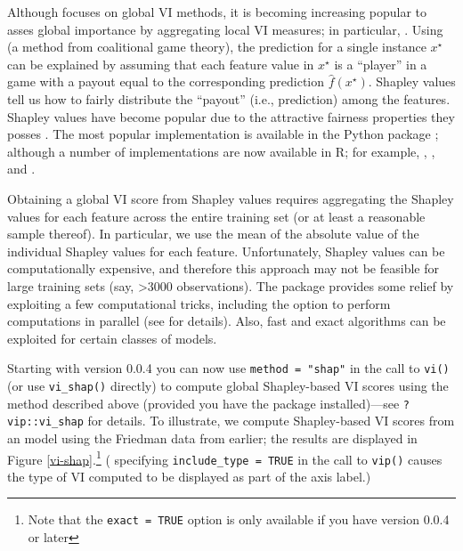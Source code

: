Although  focuses on global VI methods, it is becoming
increasing popular to asses global importance by aggregating local VI
measures; in particular, 
\citep{strumbelj-2014-explaining}. Using  (a method
from coalitional game theory), the prediction for a single instance
\(x^\star\) can be explained by assuming that each feature value in
\(x^\star\) is a ``player'' in a game with a payout equal to the
corresponding prediction \(\widehat{f}\left(x^\star\right)\). Shapley
values tell us how to fairly distribute the ``payout'' (i.e.,
prediction) among the features. Shapley values have become popular due
to the attractive fairness properties they posses
\citep{lundberg_unified_2017}. The most popular implementation is
available in the Python  package
\citep{lundberg_unified_2017}; although a number of implementations are
now available in R; for example, , 
\citep{R-iBreakDown}, and  \citep{R-fastshap}.

Obtaining a global VI score from Shapley values requires aggregating the
Shapley values for each feature across the entire training set (or at
least a reasonable sample thereof). In particular, we use the mean of
the absolute value of the individual Shapley values for each feature.
Unfortunately, Shapley values can be computationally expensive, and
therefore this approach may not be feasible for large training sets
(say, \textgreater{}3000 observations). The  package
provides some relief by exploiting a few computational tricks, including
the option to perform computations in parallel (see
 for details). Also, fast and exact algorithms
\citep{lundberg-explainable-2019} can be exploited for certain classes
of models.

Starting with  version 0.0.4 you can now use
\texttt{method\ =\ "shap"} in the call to \texttt{vi()} (or use
\texttt{vi\_shap()} directly) to compute global Shapley-based VI scores
using the method described above (provided you have the 
package installed)---see \texttt{?vip::vi\_shap} for details. To
illustrate, we compute Shapley-based VI scores from an 
model \citep{R-xgboost} using the Friedman data from earlier; the
results are displayed in Figure \ref{vi-shap}.\footnote{Note that the
  \texttt{exact\ =\ TRUE} option is only available if you have
   version 0.0.4 or later} ( specifying
\texttt{include\_type\ =\ TRUE} in the call to \texttt{vip()} causes the
type of VI computed to be displayed as part of the axis label.)

